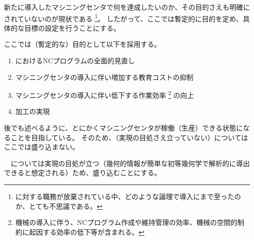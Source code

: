 

新たに導入したマシニングセンタで何を達成したいのか、その目的さえも明確にされていないのが現状である
\footnote{\MMC に対する職務が放棄されている中、どのような論理で導入にまで至ったのか、とても不思議である。}。
したがって、ここでは暫定的に目的を定め、具体的な目標の設定を行うことにする。



ここでは（暫定的な）目的として以下を採用する。
\begin{enumerate}[label=\sarrow]
\item \MMC におけるNCプログラムの全面的見直し
\item マシニングセンタの導入に伴い増加する教育コストの抑制
\item マシニングセンタの導入に伴い低下する作業効率%
\footnote{機械の導入に伴う、NCプログラム作成や維持管理の効率、機械の空間的制約に起因する効率の低下等が含まれる。}
の向上
\item \Dimple 加工の実現
\end{enumerate}
\begin{hosoku}
後でも述べるように、とにかくマシニングセンタが稼働（生産）できる状態になることを目指している。
そのため、（実現の目処さえ立っていない）\ReliefGrooveMilling についてはここでは盛り込まない。

　\Dimple については実現の目処が立つ（幾何的情報が簡単な初等幾何学で解析的に導出できると想定される）ため、盛り込むことにする。
\end{hosoku}


\clearpage


